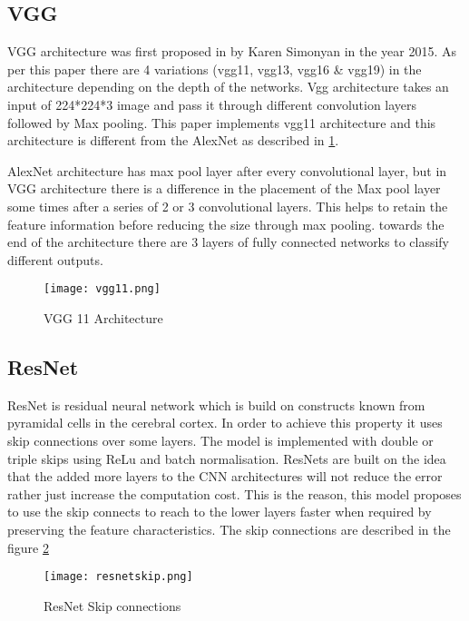 \subsection{VGG}
VGG architecture was first proposed in \cite{simonyan2014very} by Karen Simonyan in the year 2015. As per this paper there are 4 variations (vgg11, vgg13, vgg16 \& vgg19) in the architecture depending on the depth of the networks. Vgg architecture takes an input of 224*224*3 image and pass it through different convolution layers followed by Max pooling. This paper implements vgg11 architecture and this architecture is different from the AlexNet as described in \ref{fig:vgg11}.

AlexNet architecture has max pool layer after every convolutional layer, but in VGG architecture there is a difference in the placement of the Max pool layer some times after a series of 2 or 3 convolutional layers. This helps to retain the feature information before reducing the size through max pooling. towards the end of the architecture there are 3 layers of fully connected networks to classify different outputs.
\begin{figure}[h!]
	\center\texttt{[image: vgg11.png]}
	\caption{VGG 11 Architecture \cite{vgg11}}
	\label{fig:vgg11}
\end{figure}
  
\subsection{ResNet}
ResNet is residual neural network which is build on constructs known from pyramidal cells in the cerebral cortex. In order to achieve this property it uses skip connections over some layers. The model is implemented with double or triple skips using ReLu and batch normalisation. ResNets are built on the idea that the added more layers to the CNN architectures will not reduce the error rather just increase the computation cost. This is the reason, this model proposes to use the skip connects to reach to the lower layers faster when required by preserving the feature characteristics. The skip connections are described in the figure \ref{fig:resnetskip}
\begin{figure}[h!]
	\center\texttt{[image: resnetskip.png]}
	\caption{ResNet Skip connections \cite{resNet}}
	\label{fig:resnetskip}
\end{figure}

